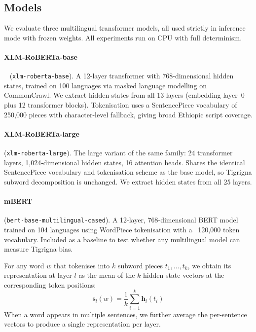 \documentclass[11pt,a4paper]{article}
\begin{document}
\subsection{Models}

We evaluate three multilingual transformer models, all used strictly in inference
mode with frozen weights. All experiments run on CPU with full determinism.

\paragraph{XLM-RoBERTa-base}~\cite{conneau2020xlm} (\texttt{xlm-roberta-base}).
A 12-layer transformer with 768-dimensional hidden states, trained on 100
languages via masked language modelling on CommonCrawl. We extract hidden states
from all 13 layers (embedding layer~0 plus 12 transformer blocks).
Tokenisation uses a SentencePiece vocabulary of 250{,}000 pieces with
character-level fallback, giving broad Ethiopic script coverage.

\paragraph{XLM-RoBERTa-large} (\texttt{xlm-roberta-large}).
The large variant of the same family: 24 transformer layers, 1{,}024-dimensional
hidden states, 16 attention heads. Shares the identical SentencePiece vocabulary
and tokenisation scheme as the base model, so Tigrigna subword decomposition
is unchanged. We extract hidden states from all 25 layers.

\paragraph{mBERT} (\texttt{bert-base-multilingual-cased}).
A 12-layer, 768-dimensional BERT model trained on 104 languages using WordPiece
tokenisation with a ~120{,}000 token vocabulary. Included as a baseline to test
whether any multilingual model can measure Tigrigna bias.

For any word $w$ that tokenises into $k$ subword pieces $t_1, \ldots, t_k$,
we obtain its representation at layer $l$ as the mean of the $k$ hidden-state
vectors at the corresponding token positions:
\begin{equation}
  \mathbf{s}_l(w) = \frac{1}{k} \sum_{i=1}^{k} \mathbf{h}_l(t_i)
  \label{eq:meanpool}
\end{equation}
When a word appears in multiple sentences, we further average the per-sentence
vectors to produce a single representation per layer.
\end{document}
